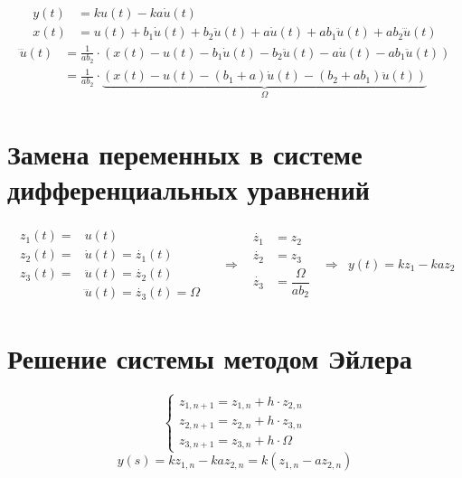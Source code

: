         \vspace{1cm}
        $$
            \begin{aligned}
                y(t) &= ku(t) - ka\dot{u}(t)
                \\
                x(t) &= u(t) + b_1\dot{u}(t) + b_2\ddot{u}(t) + a\dot{u}(t) + ab_1\ddot{u}(t) + ab_2\dddot{u}(t)
            \end{aligned}
        $$
        \vspace{1cm}
        $$
            \begin{aligned}
                \dddot{u}(t)
                &= \frac{1}{ab_2} \cdot (x(t) - u(t) - b_1\dot{u}(t) - b_2\ddot{u}(t) - a\dot{u}(t) - ab_1\ddot{u}(t))
                \\
                &= \frac{1}{ab_2} \cdot \underbrace{(x(t) - u(t) - (b_1 + a)\dot{u}(t) - (b_2 + ab_1)\ddot{u}(t))}_{\Omega}
            \end{aligned}
        $$

    \section{Замена переменных в системе дифференциальных уравнений}
        $$
            \begin{matrix}
                \begin{aligned}
                    z_1(t) = &u(t) &
                    \\
                    z_2(t) = &\dot{u}(t) = \dot{z_1}(t) &
                    \\
                    z_3(t) = &\ddot{u}(t) = \dot{z_2}(t) &
                    \\
                    &\dddot{u}(t) = \dot{z_3}(t) = \Omega &
                \end{aligned}
                &
                \Rightarrow
                &
                \begin{aligned}
                    \dot{z_1} &= z_2
                    \\
                    \dot{z_2} &= z_3
                    \\
                    \dot{z_3} &= \dfrac{\Omega}{ab_2}
                \end{aligned}
                &
                \Rightarrow
                &
                y(t) = kz_1 - kaz_2
            \end{matrix}
        $$

    \section{Решение системы методом Эйлера}
        $$
            \begin{cases}
                z_{1,n+1} = z_{1,n} + h \cdot z_{2,n}
                \\
                z_{2,n+1} = z_{2,n} + h \cdot z_{3,n}
                \\
                z_{3,n+1} = z_{3,n} + h \cdot \Omega
            \end{cases}
        $$
        $$
            y(s) = kz_{1,n} - kaz_{2,n} = k(z_{1,n} - az_{2,n})
        $$
    \newpage
